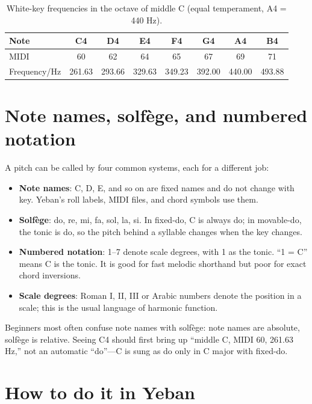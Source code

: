 \begin{table}[htbp]
\centering
\small
\caption{White-key frequencies in the octave of middle C (equal temperament, A4 = 440 Hz).}
\begin{tabular}{lccccccc}
\toprule
Note & C4 & D4 & E4 & F4 & G4 & A4 & B4 \\
\midrule
MIDI & 60 & 62 & 64 & 65 & 67 & 69 & 71 \\
Frequency/Hz & 261.63 & 293.66 & 329.63 & 349.23 & 392.00 & 440.00 & 493.88 \\
\bottomrule
\end{tabular}
\end{table}

\section{Note names, solfège, and numbered notation}

A pitch can be called by four common systems, each for a different job:

\begin{itemize}
  \item \textbf{Note names}: C, D, E, and so on are fixed names and do not change with key. Yeban's roll labels, MIDI files, and chord symbols use them.
  \item \textbf{Solfège}: do, re, mi, fa, sol, la, si. In fixed-do, C is always do; in movable-do, the tonic is do, so the pitch behind a syllable changes when the key changes.
  \item \textbf{Numbered notation}: 1–7 denote scale degrees, with 1 as the tonic. ``1 = C'' means C is the tonic. It is good for fast melodic shorthand but poor for exact chord inversions.
  \item \textbf{Scale degrees}: Roman I, II, III or Arabic numbers denote the position in a scale; this is the usual language of harmonic function.
\end{itemize}

Beginners most often confuse note names with solfège: note names are absolute, solfège is relative. Seeing C4 should first bring up ``middle C, MIDI 60, 261.63 Hz,'' not an automatic ``do''—C is sung as do only in C major with fixed-do.

\section{How to do it in Yeban}

